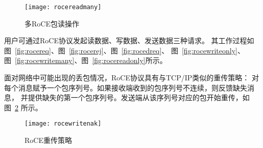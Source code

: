 \begin{figure}[htbp]
\centering
\texttt{[image: rocereadmany]}
\caption{多RoCE包读操作} \label{fig:rocereadmany}
\end{figure}

用户可通过RoCE协议发起读数据、写数据、发送数据三种请求。
其工作过程如图~\ref{fig:rocereq}、图~\ref{fig:rocerej}、图~\ref{fig:rocedreq}、
图~\ref{fig:rocewriteonly}、图~\ref{fig:rocewritemany}、图~\ref{fig:rocereadonly}所示。

面对网络中可能出现的丢包情况，RoCE协议具有与TCP/IP类似的重传策略：
对每个消息赋予一个包序列号。如果接收端收到的包序列号不连续，则反馈缺失消息，
并提供缺失的第一个包序列号。发送端从该序列号对应的包开始重传，如图~\ref{fig:rocewritenak} 所示。
\begin{figure}[htbp]
\centering
\texttt{[image: rocewritenak]}
\caption{RoCE重传策略} \label{fig:rocewritenak}
\end{figure}
